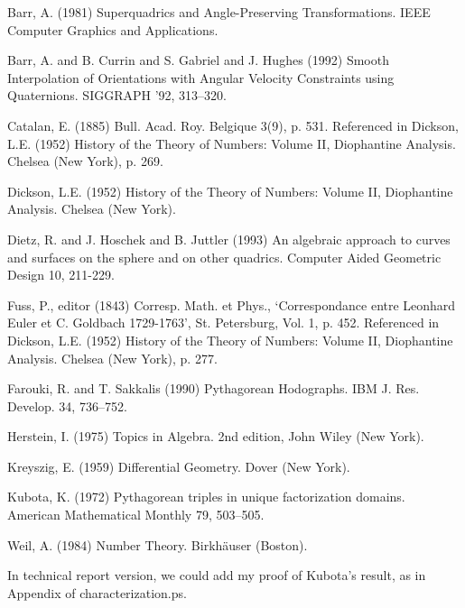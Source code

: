 \documentclass[12pt]{article}
\begin{document}

\begin{thebibliography}{99}

Barr, A. (1981) Superquadrics and Angle-Preserving Transformations.
IEEE Computer Graphics and Applications.

Barr, A. and B. Currin and S. Gabriel and J. Hughes (1992)
Smooth Interpolation of Orientations with Angular Velocity Constraints
using Quaternions.
SIGGRAPH '92, 313--320.

Catalan, E. (1885) Bull. Acad. Roy. Belgique 3(9), p. 531.
Referenced in Dickson, L.E. (1952) History of the Theory of Numbers: Volume II,
Diophantine Analysis.  Chelsea (New York), p. 269.

Dickson, L.E. (1952) History of the Theory of Numbers: Volume II,
Diophantine Analysis.  Chelsea (New York).

Dietz, R. and J. Hoschek and B. Juttler (1993)
An algebraic approach to curves and surfaces on the sphere and
on other quadrics.
Computer Aided Geometric Design 10, 211-229.


Fuss, P., editor (1843) Corresp. Math. et Phys.,
`Correspondance entre Leonhard Euler et C. Goldbach 1729-1763',
St. Petersburg, Vol. 1, p. 452.  
Referenced in Dickson, L.E. (1952) History of the Theory of Numbers: Volume II,
Diophantine Analysis.  Chelsea (New York), p. 277.

Farouki, R. and T. Sakkalis (1990)
Pythagorean Hodographs.
IBM J. Res. Develop. 34, 736--752.

Herstein, I. (1975) Topics in Algebra.
2nd edition, John Wiley (New York).

Kreyszig, E. (1959) Differential Geometry.
Dover (New York).

Kubota, K. (1972) Pythagorean triples in unique factorization domains.
American Mathematical Monthly 79, 503--505.

Weil, A. (1984) Number Theory.
Birkh\"auser (Boston).

\end{thebibliography}

In technical report version, we could add my proof of Kubota's result, 
as in Appendix of characterization.ps.
\end{document}
